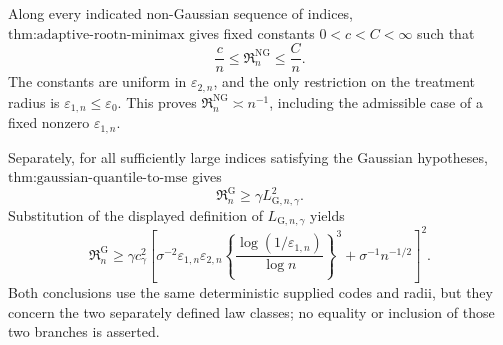 Along every indicated non-Gaussian sequence of indices, \(\text{thm:adaptive-rootn-minimax}\) gives fixed constants \(0<c<C<\infty\) such that
\[
 \frac cn\le\mathfrak R_n^{\mathrm{NG}}\le\frac Cn.
\]
The constants are uniform in \(\varepsilon_{2,n}\), and the only restriction on the treatment radius is \(\varepsilon_{1,n}\le\varepsilon_0\).  This proves \(\mathfrak R_n^{\mathrm{NG}}\asymp n^{-1}\), including the admissible case of a fixed nonzero \(\varepsilon_{1,n}\).

Separately, for all sufficiently large indices satisfying the Gaussian hypotheses, \(\text{thm:gaussian-quantile-to-mse}\) gives
\[
 \mathfrak R_n^{\mathrm G}\ge\gamma L_{\mathrm G,n,\gamma}^2.
\]
Substitution of the displayed definition of \(L_{\mathrm G,n,\gamma}\) yields
\[
 \mathfrak R_n^{\mathrm G}\ge
 \gamma c_{\gamma}^2\left[
 \sigma^{-2}\varepsilon_{1,n}\varepsilon_{2,n}
 \left\{\frac{\log(1/\varepsilon_{1,n})}{\log n}\right\}^{3}
 +\sigma^{-1}n^{-1/2}\right]^2.
\]
Both conclusions use the same deterministic supplied codes and radii, but they concern the two separately defined law classes; no equality or inclusion of those two branches is asserted.